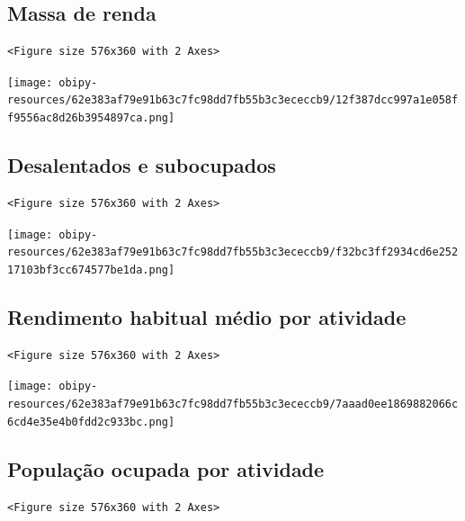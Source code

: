 \documentclass[11pt]{article}
\begin{document}
\subsection{Massa de renda}
\label{sec:org3069e89}

\begin{verbatim}
<Figure size 576x360 with 2 Axes>
\end{verbatim}


\begin{center}
\texttt{[image: obipy-resources/62e383af79e91b63c7fc98dd7fb55b3c3ececcb9/12f387dcc997a1e058ff9556ac8d26b3954897ca.png]}
\end{center}


\subsection{Desalentados e subocupados}
\label{sec:org4dc0dc9}

\begin{verbatim}
<Figure size 576x360 with 2 Axes>
\end{verbatim}


\begin{center}
\texttt{[image: obipy-resources/62e383af79e91b63c7fc98dd7fb55b3c3ececcb9/f32bc3ff2934cd6e25217103bf3cc674577be1da.png]}
\end{center}

\subsection{Rendimento habitual médio por atividade}
\label{sec:orgab0c5fd}


\begin{verbatim}
<Figure size 576x360 with 2 Axes>
\end{verbatim}


\begin{center}
\texttt{[image: obipy-resources/62e383af79e91b63c7fc98dd7fb55b3c3ececcb9/7aaad0ee1869882066c6cd4e35e4b0fdd2c933bc.png]}
\end{center}

\subsection{População ocupada por atividade}
\label{sec:orgb64f5d0}

\begin{verbatim}
<Figure size 576x360 with 2 Axes>
\end{verbatim}
\end{document}

